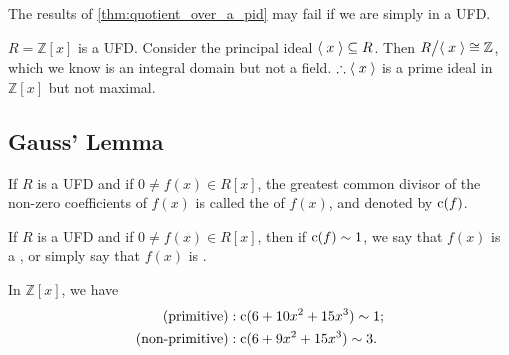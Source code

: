 \begin{note}
  The results of \cref{thm:quotient_over_a_pid} may fail if we are simply in a UFD.
\end{note}

\begin{eg}
  $R = \mathbb{Z}[x]$ is a UFD. Consider the principal ideal $\langle \; x \; \rangle \subseteq R$. Then $R \big/ \langle \; x \; \rangle \cong \mathbb{Z}$, which we know is an integral domain but not a field. $\therefore \langle \; x \; \rangle$ is a prime ideal in $\mathbb{Z}[x]$ but not maximal.
\end{eg}


\subsection{Gauss' Lemma}%
\label{sub:gauss_lemma}

\begin{defn}[Content]
\label{defn:content}
If $R$ is a UFD and if $0 \neq f(x) \in R[x]$, the greatest common divisor of the non-zero coefficients of $f(x)$ is called the  of $f(x)$, and denoted by $\operatorname{c}(f)$.
\end{defn}

\begin{defn}
\label{defn:primitive_polynomials}
If $R$ is a UFD and if $0 \neq f(x) \in R[x]$, then if $\operatorname{c}(f) \sim 1$, we say that $f(x)$ is a , or simply say that $f(x)$ is .
\end{defn}

\begin{eg}
  In $\mathbb{Z}[x]$, we have
  \begin{align*}
    \text{(primitive)} &: \operatorname{c}( 6 + 10x^2 + 15x^3 ) \sim 1; \\
    \text{(non-primitive)} &: \operatorname{c}( 6 + 9x^2 + 15x^3 ) \sim 3.
  \end{align*}
\end{eg}



